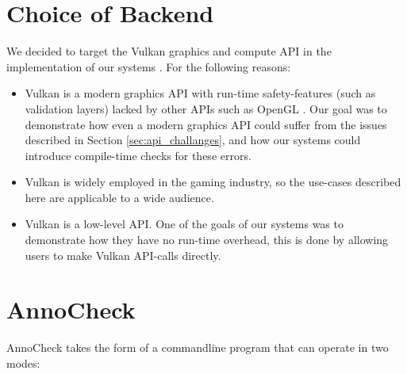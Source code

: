 \documentclass[a4paper,12pt,twoside,openright]{report}
\begin{document}
\section{Choice of Backend}

\label{sec:backend_choice}

We decided to target the Vulkan graphics and compute API in the implementation
of our systems \cite{Vulkan}. For the following reasons:

\begin{itemize}

    \item Vulkan is a modern graphics API with run-time safety-features (such as
    validation layers) lacked by other APIs such as OpenGL
    \cite{VulkanValidationLayers}. Our goal was to demonstrate how even a
    modern graphics API could suffer from the issues described in Section
    \ref{sec:api_challanges}, and how our systems could introduce compile-time
    checks for these errors.

    \item Vulkan is widely employed in the gaming industry, so the use-cases
    described here are applicable to a wide audience.

    \item Vulkan is a low-level API. One of the goals of our systems was to
    demonstrate how they have no run-time overhead, this is done by allowing
    users to make Vulkan API-calls directly.

\end{itemize}

\section{AnnoCheck}

\label{sec:anno_check_implementation}

AnnoCheck takes the form of a commandline program that can operate in two
modes:
\end{document}
